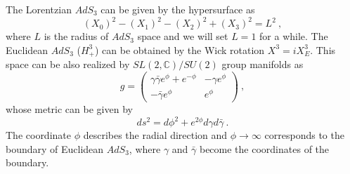 \documentclass[a4paper,12pt]{article}
\newcommand{\bc}{\mathbb C}
\begin{document}
The Lorentzian $AdS_3$ can be given by the hypersurface
as 
\begin{equation}
 (X_0)^2 - (X_1)^2 - (X_2)^2 + (X_3)^2 = L^2 ~,
\label{AdS(3)}
\end{equation} 
where $L$ is the radius of $AdS_3$ space and we will set $L=1$ for a while.
The Euclidean $AdS_3$ ($H_+^3$) can be obtained by the Wick rotation 
$X^3 = i X^3_E$. 
This space can be also realized by $SL(2,\bc)/SU(2)$ group manifolds
as 
\begin{equation}
 g = \left(
  \begin{array}{cc}
   \gamma \bar{\gamma} e^{\phi} + e^{-\phi} & - \gamma e^{\phi} \\
   - \bar{\gamma} e^{\phi} & e^{\phi}
  \end{array}
  \right)~,
\label{gamma}
\end{equation}
whose metric can be given by
\begin{equation}
 ds^2 = d \phi ^2 + e^{2 \phi} d \gamma d \bar{\gamma} ~. 
\end{equation} 
The coordinate $\phi$ describes the radial direction and $\phi \to
\infty$ corresponds to the boundary of Euclidean $AdS_3$, where
$\gamma$ and $\bar{\gamma}$ become the coordinates of the boundary. 
\end{document}
